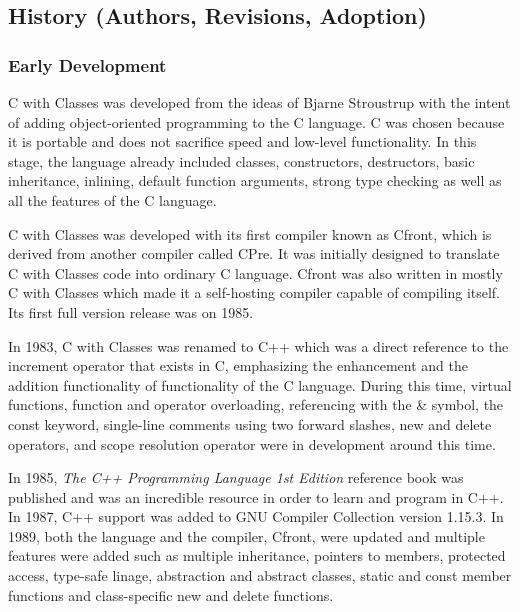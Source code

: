 \documentclass[12pt]{article}
\begin{document}
\subsection{History (Authors, Revisions, Adoption)}
\subsubsection{Early Development}
C with Classes was developed from the ideas of Bjarne Stroustrup with the intent of adding object-oriented programming to the C language. C was chosen because it is portable and does not sacrifice speed and low-level functionality. In this stage, the language already included classes, constructors, destructors, basic inheritance, inlining, default function arguments, strong type checking as well as all the features of the C language.

C with Classes was developed with its first compiler known as Cfront, which is derived from another compiler called CPre. It was initially designed to translate C with Classes code into ordinary C language. Cfront was also written in mostly C with Classes which made it a self-hosting compiler capable of compiling itself. Its first full version release was on 1985.

In 1983, C with Classes was renamed to C++ which was a direct reference to the increment operator that exists in C, emphasizing the enhancement and the addition functionality of functionality of the C language. During this time, virtual functions, function and operator overloading, referencing with the \& symbol, the const keyword, single-line comments using two forward slashes, new and delete operators, and scope resolution operator were in development around this time. 

In 1985, \textit{The C++ Programming Language 1st Edition} reference book was published and was an incredible resource in order to learn and program in C++. In 1987, C++ support was added to GNU Compiler Collection version 1.15.3. In 1989, both the language and the compiler, Cfront, were updated and multiple features were added such as multiple inheritance, pointers to members, protected access, type-safe linage, abstraction and abstract classes, static and const member functions and class-specific new and delete functions. 
\end{document}
